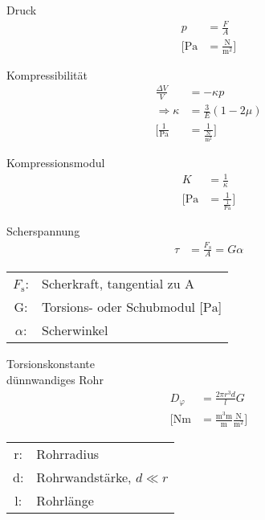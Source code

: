 \begin{karte}{Druck}
   \begin{align*}
       p &= \frac{F}{A} \\
       \bigg[ \si{\pascal} &= \frac{\si{\newton}}{\si{\square\meter}} \bigg]
   \end{align*}
\end{karte}

\begin{karte}{Kompressibilität}
   \begin{align*}
        \frac{\Delta V}{V} &= -\kappa p \\
        \Rightarrow \kappa &= \frac{3}{E} (1-2\mu) \\
        \Bigg[ \frac{1}{\si{\pascal}} &= \frac{1}{\frac{\si{\newton}}{\si{\square\meter}}} \Bigg]
   \end{align*}
\end{karte}

\begin{karte}{Kompressionsmodul}
   \begin{align*}
       K &= \frac{1}{\kappa} \\
       \Bigg[ \si{\pascal} &= \frac{1}{\frac{1}{\si{\pascal}}} \Bigg]
   \end{align*}
\end{karte}

\begin{karte}{Scherspannung}
   \begin{align*}
       \tau &= \frac{F_\text{s}}{A} = G \alpha
   \end{align*}
    \begin{tabular}[t]{cl}
        \(F_\text{s}\): & Scherkraft, tangential zu A \\
        G: & Torsions- oder Schubmodul [\(\si{\pascal}\)]\\
        \(\alpha\): & Scherwinkel
    \end{tabular}
\end{karte}

\begin{karte}{Torsionskonstante\\dünnwandiges Rohr}
   \begin{align*}
       D_\varphi  &= \frac{2\pi r^3 d}{l}G \\
       \bigg[ \si{\newton\meter} &= \frac{\si{\cubic\meter\meter}}{\si{\meter}}\frac{\si{\newton}}{\si{\square\meter}} \bigg]
   \end{align*}
    \begin{tabular}[t]{cl}
        r: & Rohrradius \\
        d: & Rohrwandstärke, \(d \ll r\) \\
        l: & Rohrlänge
    \end{tabular}
\end{karte}


